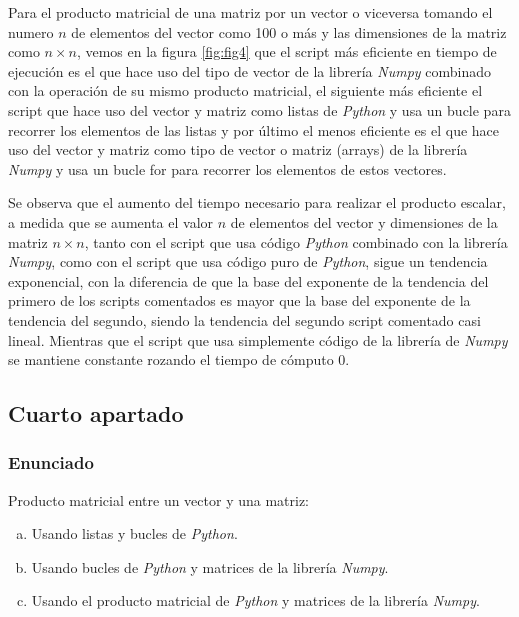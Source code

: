 \documentclass[12pt,twoside]{article}
\begin{document}
Para el producto matricial de una matriz por un vector o viceversa tomando el numero $n$ de elementos del vector como 100 o más y las dimensiones de la matriz como $n \times n$, vemos en la figura \ref{fig:fig4} que el script más eficiente en tiempo de ejecución es el que hace uso del tipo de vector de la librería \textit{Numpy} combinado con la operación de su mismo producto matricial, el siguiente más eficiente el script que hace uso del vector y matriz como listas de \textit{Python} y usa un bucle para recorrer los elementos de las listas y por último el menos eficiente es el que hace uso del vector y matriz como tipo de vector o matriz (arrays) de la librería \textit{Numpy} y usa un bucle for para recorrer los elementos de estos vectores.

Se observa que el aumento del tiempo necesario para realizar el producto escalar, a medida que se aumenta el valor $n$ de elementos del vector y dimensiones de la matriz $n \times n$, tanto con el script que usa código \textit{Python} combinado con la librería \textit{Numpy}, como con el script que usa código puro de \textit{Python}, sigue un tendencia exponencial, con la diferencia de que la base del exponente de la tendencia del primero de los scripts comentados es mayor que la base del exponente de la tendencia del segundo, siendo la tendencia del segundo script comentado casi lineal. Mientras que el script que usa simplemente código de la librería de \textit{Numpy} se mantiene constante rozando el tiempo de cómputo 0.

\subsection{Cuarto apartado}

\subsubsection{Enunciado}

\noindent
Producto matricial entre un vector y una matriz:

\begin{enumerate}[(a)]

\item Usando listas y bucles de \textit{Python}.

\item Usando bucles de \textit{Python} y matrices de la librería \textit{Numpy}.

\item Usando el producto matricial de \textit{Python} y matrices de la librería \textit{Numpy}.

\end{enumerate}
\end{document}
